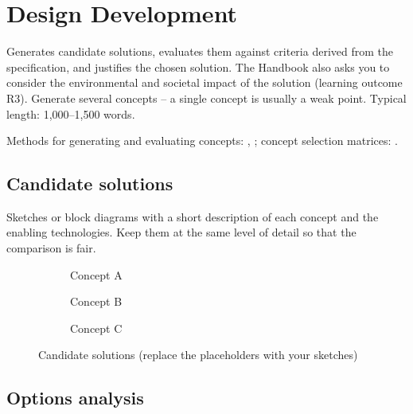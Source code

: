\chapter{Design Development}
\label{ch:design}

\begin{guidance}
Generates candidate solutions, evaluates them against criteria derived from
the specification, and justifies the chosen solution. The Handbook also asks
you to consider the environmental and societal impact of the solution
(learning outcome R3). Generate several concepts -- a single concept is
usually a weak point. Typical length: 1,000--1,500 words.

Methods for generating and evaluating concepts: \textcite{cross2008},
\textcite{dym2009}; concept selection matrices: \textcite{ulrich2012}.
\end{guidance}

\section{Candidate solutions}
\label{sec:concepts}

\begin{guidance}
Sketches or block diagrams with a short description of each concept and the
enabling technologies. Keep them at the same level of detail so that the
comparison is fair.
\end{guidance}

\begin{figure}[htbp]
  \centering
  \begin{subfigure}[b]{0.32\linewidth}
    \caption{Concept A}
  \end{subfigure}\hfill
  \begin{subfigure}[b]{0.32\linewidth}
    \caption{Concept B}
  \end{subfigure}\hfill
  \begin{subfigure}[b]{0.32\linewidth}
    \caption{Concept C}
  \end{subfigure}
  \caption{Candidate solutions (replace the placeholders with your sketches)}
  \label{fig:concepts}
\end{figure}

\section{Options analysis}
\label{sec:options}

